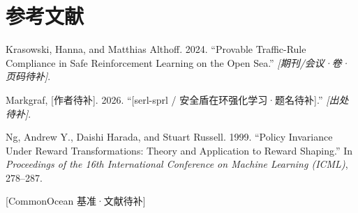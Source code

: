 \documentclass[12pt,letterpaper]{article}
\newcommand{\refitem}[1]{\par\noindent\hangindent=0.5in\hangafter=1 #1\par\vspace{6pt}}
\begin{document}
\section{参考文献}
\refitem{Krasowski, Hanna, and Matthias Althoff. 2024. ``Provable Traffic-Rule Compliance in Safe Reinforcement Learning on the Open Sea.'' \textit{[期刊/会议·卷·页码待补]}.}

\refitem{Markgraf, [作者待补]. 2026. ``[serl-sprl / 安全盾在环强化学习·题名待补].'' \textit{[出处待补]}.}

\refitem{Ng, Andrew Y., Daishi Harada, and Stuart Russell. 1999. ``Policy Invariance Under Reward Transformations: Theory and Application to Reward Shaping.'' In \textit{Proceedings of the 16th International Conference on Machine Learning (ICML)}, 278--287.}

\refitem{[CommonOcean 基准·文献待补]}
\end{document}
